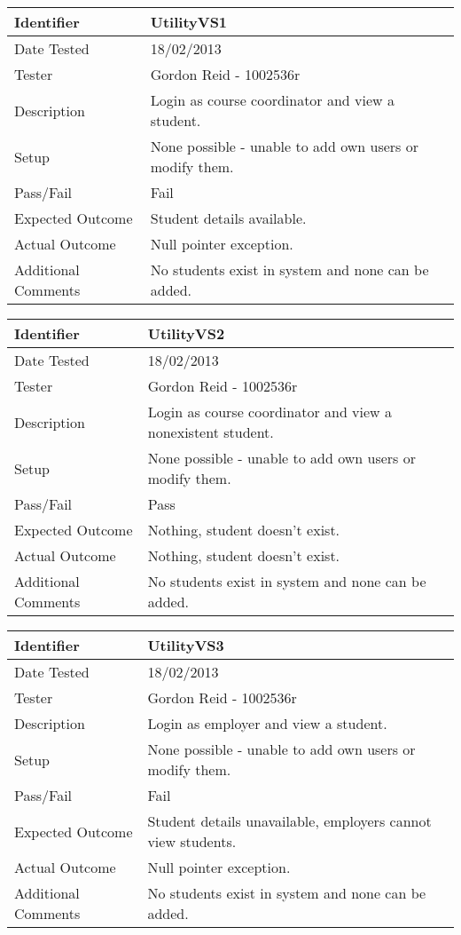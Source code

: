 \begin{tabularx}{\textwidth}{|T|L|}
\hline
Identifier & UtilityVS1\\
\hline
Date Tested & 18/02/2013\\
\hline
Tester & Gordon Reid - 1002536r\\
\hline
Description & Login as course coordinator and view a student.\\
\hline
Setup & None possible - unable to add own users or modify them.\\
\hline
Pass/Fail & Fail\\
\hline
Expected Outcome & Student details available.\\
\hline
Actual Outcome & Null pointer exception.\\
\hline
Additional Comments & No students exist in system and none can be added.\\
\hline
\end{tabularx}

\vspace{2em}

\begin{tabularx}{\textwidth}{|T|L|}
\hline
Identifier & UtilityVS2\\
\hline
Date Tested & 18/02/2013\\
\hline
Tester & Gordon Reid - 1002536r\\
\hline
Description & Login as course coordinator and view a nonexistent student.\\
\hline
Setup & None possible - unable to add own users or modify them.\\
\hline
Pass/Fail & Pass\\
\hline
Expected Outcome & Nothing, student doesn't exist.\\
\hline
Actual Outcome & Nothing, student doesn't exist.\\
\hline
Additional Comments & No students exist in system and none can be added.\\
\hline
\end{tabularx}

\vspace{2em}

\begin{tabularx}{\textwidth}{|T|L|}
\hline
Identifier & UtilityVS3\\
\hline
Date Tested & 18/02/2013\\
\hline
Tester & Gordon Reid - 1002536r\\
\hline
Description & Login as employer and view a student.\\
\hline
Setup & None possible - unable to add own users or modify them.\\
\hline
Pass/Fail & Fail\\
\hline
Expected Outcome & Student details unavailable, employers cannot view
students.\\
\hline
Actual Outcome & Null pointer exception.\\
\hline
Additional Comments & No students exist in system and none can be added.\\
\hline
\end{tabularx}

